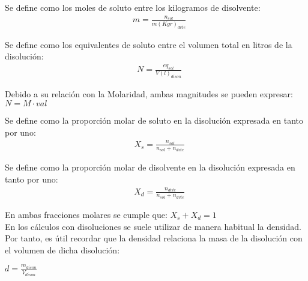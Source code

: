 \begin{definition}[Molalidad]
	Se define como los moles de soluto entre los kilogramos de disolvente:
	\begin{align}
		& m =\frac{n_{sol}}{m(Kgr)_{dvte}}
	\end{align}
\end{definition}

\begin{definition}[Normalidad]
	Se define como los equivalentes de soluto entre el volumen total en litros de la disolución:
	\begin{align}
		& N =\frac{eq_{sol}}{V(l)_{dison}}
	\end{align}
\end{definition}

Debido a su relación con la Molaridad, ambas magnitudes se pueden expresar: \textbf{$N = M\cdot val$}

\begin{definition}
Se define como la proporción molar de soluto en la disolución expresada en tanto por uno:
	\begin{align}
		& X_s=\frac{n_{sol}}{n_{sol}+n_{dvte}}
	\end{align}
\end{definition}

\begin{definition}
	Se define como la proporción molar de disolvente en la disolución expresada en tanto por uno:
	\begin{align}
		& X_d=\frac{n_{dvte}}{n_{sol}+n_{dvte}}
	\end{align}
\end{definition}

En ambas fracciones molares se cumple que: \textbf{$X_s + X_d = 1$}\\

En los cálculos con disoluciones se suele utilizar de manera habitual la densidad. Por tanto, es útil recordar que la densidad relaciona la masa de la disolución con el volumen de dicha disolución:\\

\begin{center}
	$d=\frac{m_{dison}}{V_{dison}}$
\end{center}

